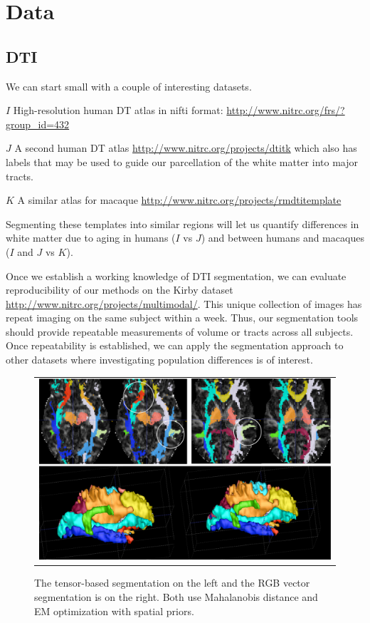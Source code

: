 \documentclass[11pt,english]{article}
\begin{document}
\section{Data}
\subsection{DTI}
We can start small with a couple of interesting datasets. 

\noindent $I$ High-resolution human DT atlas in nifti format: \url{http://www.nitrc.org/frs/?group_id=432}

\noindent $J$ A second human DT atlas
\url{http://www.nitrc.org/projects/dtitk} which also has labels that
may be used to guide our parcellation of the white matter into major
tracts.

\noindent $K$ A similar atlas for macaque \url{http://www.nitrc.org/projects/rmdtitemplate}

Segmenting these templates into similar regions will let us quantify
differences in white matter due to aging in humans ($I$ vs $J$) and
between humans and macaques ($I$ and $J$ vs $K$).

Once we establish a working knowledge of DTI segmentation, we can
evaluate reproducibility of our methods on the Kirby dataset
\url{http://www.nitrc.org/projects/multimodal/}.  This unique
collection of images has repeat imaging on the same subject within a
week.  Thus, our segmentation tools should provide repeatable
measurements of volume or tracts across all subjects.  Once
repeatability is established, we can apply the segmentation approach
to other datasets where investigating population differences is of
interest.

\begin{figure}
\begin{center}
\begin{tabular}{c}
\includegraphics[width=6in]{Figures/004_vec_vs_dti.pdf}
\end{tabular}
\caption{The tensor-based segmentation on the left and the
  RGB vector segmentation is on the right.  Both use Mahalanobis
  distance and EM optimization with spatial priors.}
\label{fig:example1}
\end{center}
\end{figure}
\end{document}
